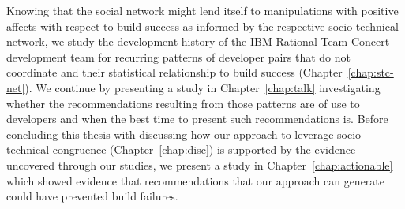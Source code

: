 Knowing that the social network might lend itself to manipulations with positive affects with respect to build success as informed by the respective socio-technical network, we study the development history of the IBM Rational Team Concert development team for recurring patterns of developer pairs that do not coordinate and their statistical relationship to build success (Chapter~\ref{chap:stc-net}).
We continue by presenting a study in Chapter~\ref{chap:talk} investigating whether the recommendations resulting from those patterns are of use to developers and when the best time to present such recommendations is.
Before concluding this thesis with discussing how our approach to leverage socio-technical congruence (Chapter~\ref{chap:disc}) is supported by the evidence uncovered through our studies, we present a study in Chapter~\ref{chap:actionable} which showed evidence that 
recommendations that our approach can generate could have prevented build failures.






















